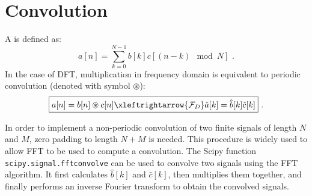 \section{Convolution}

%

A  is defined as:
\begin{equation}
a[n] = \sum_{k=0}^{N-1} b[k]c[(n-k) \mod N] \,\,.
\end{equation}
In the case of DFT, multiplication in frequency domain is equivalent
to periodic convolution (denoted with symbol $\circledast$):
\begin{equation}
  \boxed{
    a[n] = b[n] \circledast c[n] \xleftrightarrow{\mathcal{F}_D} \hat{a}[k] = \hat{b}[k]\hat{c}[k]
    } \,\,.
\end{equation}

In order to implement a non-periodic convolution of two finite signals
of length $N$ and $M$, zero padding to length $N+M$ is needed. This
procedure is widely used to allow FFT to be used to compute a
convolution. The Scipy function \texttt{scipy.signal.fftconvolve} can
be used to convolve two signals using the FFT algorithm. It first
calculates $\hat{b}[k]$ and $\hat{c}[k]$, then multiplies them
together, and finally performs an inverse Fourier transform to obtain
the convolved signals. 

